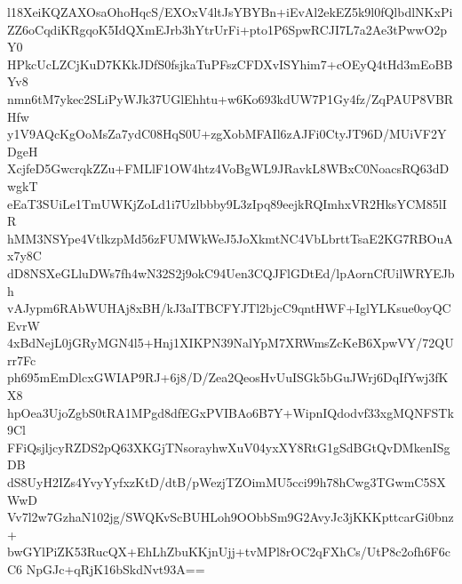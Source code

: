 l18XeiKQZAXOsaOhoHqcS/EXOxV4ltJsYBYBn+iEvAl2ekEZ5k9l0fQlbdlNKxPi
ZZ6oCqdiKRgqoK5IdQXmEJrb3hYtrUrFi+pto1P6SpwRCJI7L7a2Ae3tPwwO2pY0
HPkcUcLZCjKuD7KKkJDfS0fsjkaTuPFszCFDXvISYhim7+cOEyQ4tHd3mEoBBYv8
nmn6tM7ykec2SLiPyWJk37UGlEhhtu+w6Ko693kdUW7P1Gy4fz/ZqPAUP8VBRHfw
y1V9AQcKgOoMsZa7ydC08HqS0U+zgXobMFAIl6zAJFi0CtyJT96D/MUiVF2YDgeH
XcjfeD5GwcrqkZZu+FMLlF1OW4htz4VoBgWL9JRavkL8WBxC0NoacsRQ63dDwgkT
eEaT3SUiLe1TmUWKjZoLd1i7Uzlbbby9L3zIpq89eejkRQImhxVR2HksYCM85lIR
hMM3NSYpe4VtlkzpMd56zFUMWkWeJ5JoXkmtNC4VbLbrttTsaE2KG7RBOuAx7y8C
dD8NSXeGLluDWs7fh4wN32S2j9okC94Uen3CQJFlGDtEd/lpAornCfUilWRYEJbh
vAJypm6RAbWUHAj8xBH/kJ3aITBCFYJTl2bjcC9qntHWF+IglYLKsue0oyQCEvrW
4xBdNejL0jGRyMGN4l5+Hnj1XIKPN39NalYpM7XRWmsZcKeB6XpwVY/72QUrr7Fc
ph695mEmDlcxGWIAP9RJ+6j8/D/Zea2QeosHvUuISGk5bGuJWrj6DqIfYwj3fKX8
hpOea3UjoZgbS0tRA1MPgd8dfEGxPVIBAo6B7Y+WipnIQdodvf33xgMQNFSTk9Cl
FFiQsjljcyRZDS2pQ63XKGjTNsorayhwXuV04yxXY8RtG1gSdBGtQvDMkenISgDB
dS8UyH2IZs4YvyYyfxzKtD/dtB/pWezjTZOimMU5cci99h78hCwg3TGwmC5SXWwD
Vv7l2w7GzhaN102jg/SWQKvScBUHLoh9OObbSm9G2AvyJc3jKKKpttcarGi0bnz+
bwGYlPiZK53RucQX+EhLhZbuKKjnUjj+tvMPl8rOC2qFXhCs/UtP8c2ofh6F6cC6
NpGJc+qRjK16bSkdNvt93A==
